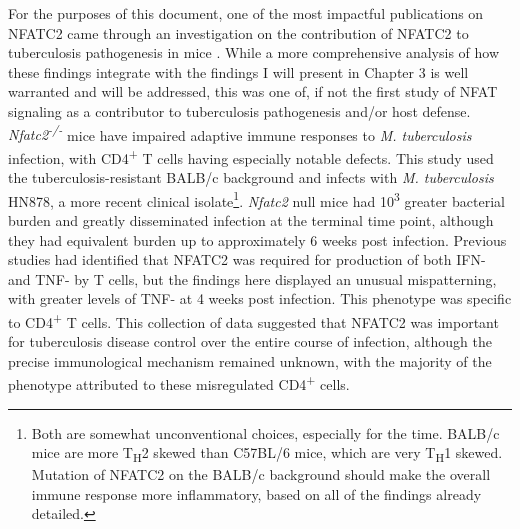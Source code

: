 For the purposes of this document, one of the most impactful publications on NFATC2 came through an investigation on the contribution of NFATC2 to tuberculosis pathogenesis in mice \citep{Via2012}. While a more comprehensive analysis of how these findings integrate with the findings I will present in Chapter 3 is well warranted and will be addressed, this was one of, if not the first study of NFAT signaling as a contributor to tuberculosis pathogenesis and/or host defense. \textit{Nfatc2\textsuperscript{-/-}} mice have impaired adaptive immune responses to \textit{M. tuberculosis} infection, with CD4\textsuperscript{+} T cells having especially notable defects. This study used the tuberculosis-resistant BALB/c background and infects with \textit{M. tuberculosis} HN878, a more recent clinical isolate\footnote{Both are somewhat unconventional choices, especially for the time. BALB/c mice are more T\textsubscript{H}2 skewed than C57BL/6 mice, which are very T\textsubscript{H}1 skewed. Mutation of NFATC2 on the BALB/c background should make the overall immune response more inflammatory, based on all of the findings already detailed.}. \textit{Nfatc2} null mice had 10\textsuperscript{3} greater bacterial burden and greatly disseminated infection at the terminal time point, although they had equivalent burden up to approximately 6 weeks post infection. Previous studies had identified that NFATC2 was required for production of both IFN-\textgamma{} and TNF-\textalpha{} by T cells, but the findings here displayed an unusual mispatterning, with greater levels of TNF-\textalpha{} at 4 weeks post infection. This phenotype was specific to CD4\textsuperscript{+} T cells. This collection of data suggested that NFATC2 was important for tuberculosis disease control over the entire course of infection, although the precise immunological mechanism remained unknown, with the majority of the phenotype attributed to these misregulated CD4\textsuperscript{+} cells. 

